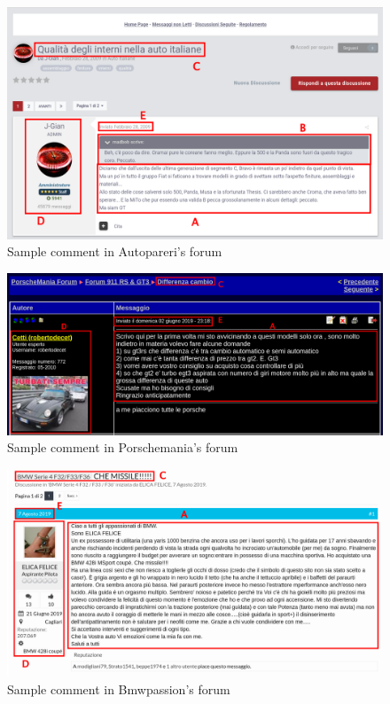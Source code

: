 \begin{figure}[!htb]
	\centering
	\includegraphics[width=1\textwidth]{figures/screen/screen-autopareri.png}
	\caption{Sample comment in Autopareri's forum}
	\label{fig:screen-autopareri}
\end{figure}

\begin{figure}[!htb]
	\centering
	\includegraphics[width=1\textwidth]{figures/screen/screen-porschemania.png}
	\caption{Sample comment in Porschemania's forum}
	\label{fig:screen-porschemania}
\end{figure}

\begin{figure}[!htb]
	\centering
	\includegraphics[width=1\textwidth]{figures/screen/screen-bmwpassion.png}
	\caption{Sample comment in Bmwpassion's forum}
	\label{fig:screen-bmwpassion}
\end{figure}

